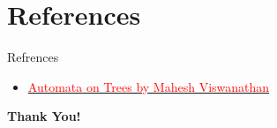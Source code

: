 \documentclass[10pt,svgnames,fragile]{beamer}
\begin{document}
\section{References}
\begin{frame}{Refrences}

\begin{itemize}
    \item {\hypersetup{urlcolor=red}\href{https://courses.grainger.illinois.edu/cs474/fa2021/fa2020Notes/TreeAutomata.pdf}{\textcolor{red}{Automata on Trees by Mahesh Viswanathan}}}
\end{itemize}
\end{frame}
\begin{frame}{}

\begin{center}
    \textbf{\Huge{Thank You!}}
\end{center}
    
\end{frame}
\end{document}
